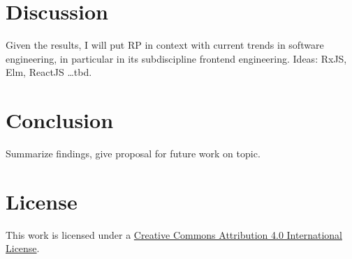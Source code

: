 \documentclass[11pt,a4paper,twocolumn]{article}
\begin{document}
	\section{Discussion}
	Given the results, I will put RP in context with current trends in software engineering, in particular in its subdiscipline frontend engineering.
	Ideas: RxJS, Elm, ReactJS \dots tbd.

	\section{Conclusion}
	Summarize findings, give proposal for future work on topic.

	
	

	\section*{License}
	\ccby\thinspace\thinspace This work is licensed under a \href{https://creativecommons.org/licenses/by/4.0/}{Creative Commons Attribution 4.0 International License}.
\end{document}
